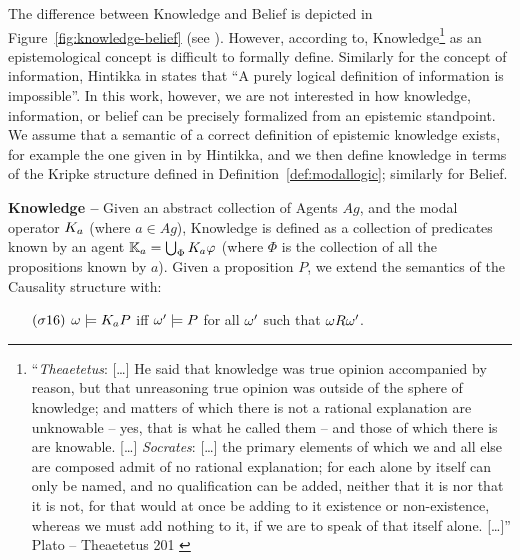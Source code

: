 The difference between Knowledge and Belief is depicted in
Figure~\ref{fig:knowledge-belief} (see \autocite{wiki-knowledgebelief}).  However,
according to\autocite{Gettier2012knowledge},
Knowledge\footnote{``\emph{Theaetetus}: [\ldots] He said that knowledge was
true opinion accompanied by reason, but that unreasoning true opinion was
outside of the sphere of knowledge; and matters of which there is not a
rational explanation are unknowable -- yes, that is what he called them -- and
those of which there is are knowable. [\ldots] \emph{Socrates}: [\ldots] the
primary elements of which we and all else are composed admit of no rational
explanation; for each alone by itself can only be named, and no qualification
can be added, neither that it is nor that it is not, for that would at once be
adding to it existence or non-existence, whereas we must add nothing to it, if
we are to speak of that itself alone.  [\ldots]'' Plato -- Theaetetus 201
\autocite{Plato1914Plato}} as an epistemological concept is difficult to formally define. 
Similarly for the concept of information, Hintikka in \autocite{Hintikka1993Information}
states that ``A purely logical definition of information is impossible''.
In this work, however, we are not interested in how knowledge, information, or
belief can be precisely formalized from an epistemic standpoint.  We assume
that a semantic of a correct definition of epistemic knowledge exists, for
example the one given in\autocite{Hintikka1962knowledge} by Hintikka, and we
then define knowledge in terms of the Kripke structure defined in
Definition~\ref{def:modallogic}; similarly for Belief.

\begin{definition}{\bf Knowledge --}\label{def:knowledge}
Given an abstract collection of Agents $Ag$, and the modal operator
	$K_{a}$ (where $a\in Ag$), Knowledge is defined as a collection
	of predicates known by an agent $\mathbb{K}_{a}=\bigcup_\Phi K_{a}\varphi$ 
	(where $\Phi$ is the collection of all the propositions known by $a$).
	Given a proposition $P$, we extend the semantics of the Causality structure with:
	\begin{enumerate}[noitemsep]
		\item[$(\sigma16)$] $\omega\models K_{a}P$ iff
			$\omega'\models P$ for all $\omega'$ such that
			$\omega R\omega'$.
	\end{enumerate}
\end{definition}

